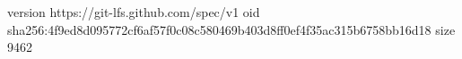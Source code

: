 version https://git-lfs.github.com/spec/v1
oid sha256:4f9ed8d095772cf6af57f0c08c580469b403d8ff0ef4f35ac315b6758bb16d18
size 9462
